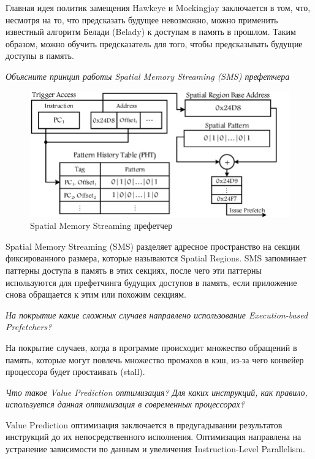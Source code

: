 	Главная идея политик замещения Hawkeye и Mockingjay заключается в том, что, несмотря на то, что предсказать будущее невозможно, можно применить известный алгоритм Белади (Belady) к доступам в память в прошлом. Таким образом, можно обучить предсказатель для того, чтобы предсказывать будущие доступы в память.
	
	\textit{Объясните принцип работы Spatial Memory Streaming (SMS) префетчера}
	
	\begin{figure}[h!]
		\centering
		\includegraphics[width=\linewidth]{pictures/SMS.png}
		\caption{Spatial Memory Streaming префетчер}
	\end{figure}
	
	Spatial Memory Streaming (SMS) разделяет адресное пространство на секции фиксированного размера, которые называются Spatial Regions. SMS запоминает паттерны доступа в память в этих секциях, после чего эти паттерны используются для префетчинга будущих доступов в память, если приложение снова обращается к этим или похожим секциям.
	
	\newpage
	
	\textit{На покрытие какие сложных случаев направлено использование Execution-based Prefetchers?}

	На покрытие случаев, когда в программе происходит множество обращений в память, которые могут повлечь множество промахов в кэш, из-за чего конвейер процессора будет простаивать (stall).
	
	\textit{Что такое Value Prediction оптимизация? Для каких инструкций, как правило, используется данная оптимизация в современных процессорах?}
	
	Value Prediction оптимизация заключается в предугадывании результатов инструкций до их непосредственного исполнения. Оптимизация направлена на устранение зависимости по данным и увеличения Instruction-Level Parallelism.
	
